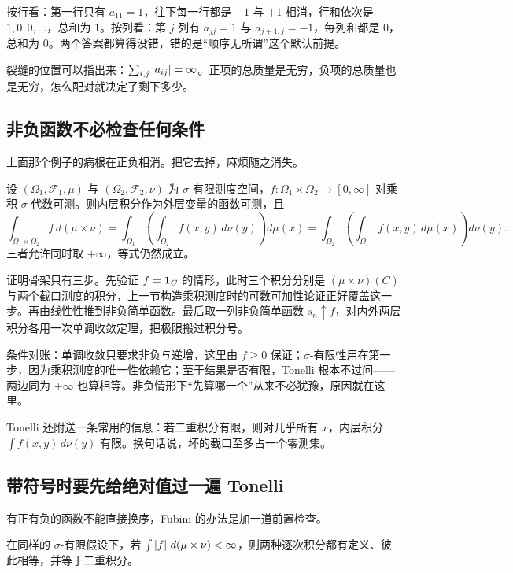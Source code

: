 按行看：第一行只有 \(a_{11}=1\)，往下每一行都是 \(-1\) 与 \(+1\) 相消，行和依次是 \(1,0,0,\dots\)，总和为 1。按列看：第 \(j\) 列有 \(a_{jj}=1\) 与 \(a_{j+1,j}=-1\)，每列和都是 0，总和为 0。两个答案都算得没错，错的是``顺序无所谓''这个默认前提。

裂缝的位置可以指出来：\(\sum_{i,j}\left|a_{ij}\right|=\infty\)。正项的总质量是无穷，负项的总质量也是无穷，怎么配对就决定了剩下多少。

\subsection{非负函数不必检查任何条件}

上面那个例子的病根在正负相消。把它去掉，麻烦随之消失。

\begin{theorem}[Tonelli]
设 \((\Omega_1,\mathcal F_1,\mu)\) 与 \((\Omega_2,\mathcal F_2,\nu)\) 为 \(\sigma\)-有限测度空间，\(f:\Omega_1\times\Omega_2\to[0,\infty]\) 对乘积 \(\sigma\)-代数可测。则内层积分作为外层变量的函数可测，且
\[
\int_{\Omega_1\times\Omega_2}\!\!f\,d(\mu\times\nu)
=\int_{\Omega_1}\!\left(\int_{\Omega_2}f(x,y)\,d\nu(y)\right)\!d\mu(x)
=\int_{\Omega_2}\!\left(\int_{\Omega_1}f(x,y)\,d\mu(x)\right)\!d\nu(y).
\]
三者允许同时取 \(+\infty\)，等式仍然成立。
\end{theorem}

证明骨架只有三步。先验证 \(f=\mathbf{1}_C\) 的情形，此时三个积分分别是 \((\mu\times\nu)(C)\) 与两个截口测度的积分，上一节构造乘积测度时的可数可加性论证正好覆盖这一步。再由线性性推到非负简单函数。最后取一列非负简单函数 \(s_n\uparrow f\)，对内外两层积分各用一次单调收敛定理，把极限搬过积分号。

条件对账：单调收敛只要求非负与递增，这里由 \(f\ge0\) 保证；\(\sigma\)-有限性用在第一步，因为乘积测度的唯一性依赖它；至于结果是否有限，Tonelli 根本不过问——两边同为 \(+\infty\) 也算相等。非负情形下``先算哪一个''从来不必犹豫，原因就在这里。

Tonelli 还附送一条常用的信息：若二重积分有限，则对几乎所有 \(x\)，内层积分 \(\int f(x,y)\,d\nu(y)\) 有限。换句话说，坏的截口至多占一个零测集。

\subsection{带符号时要先给绝对值过一遍 Tonelli}

有正有负的函数不能直接换序，Fubini 的办法是加一道前置检查。

\begin{theorem}[Fubini]
在同样的 \(\sigma\)-有限假设下，若 \(\int\left|f\right|\,d(\mu\times\nu)<\infty\)，则两种逐次积分都有定义、彼此相等，并等于二重积分。
\end{theorem}

